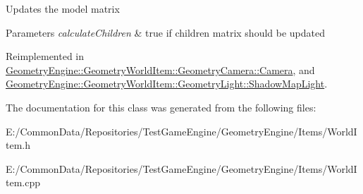 Updates the model matrix 
\begin{DoxyParams}{Parameters}
{\em calculate\+Children} & true if children matrix should be updated \\
\hline
\end{DoxyParams}


Reimplemented in \mbox{\hyperlink{class_geometry_engine_1_1_geometry_world_item_1_1_geometry_camera_1_1_camera_afe7145a1edb13ce3a50c2964f5c865e9}{Geometry\+Engine\+::\+Geometry\+World\+Item\+::\+Geometry\+Camera\+::\+Camera}}, and \mbox{\hyperlink{class_geometry_engine_1_1_geometry_world_item_1_1_geometry_light_1_1_shadow_map_light_a0465932bd0494929e5daa10ce8b77aa6}{Geometry\+Engine\+::\+Geometry\+World\+Item\+::\+Geometry\+Light\+::\+Shadow\+Map\+Light}}.



The documentation for this class was generated from the following files\+:\begin{DoxyCompactItemize}
\item 
E\+:/\+Common\+Data/\+Repositories/\+Test\+Game\+Engine/\+Geometry\+Engine/\+Items/World\+Item.\+h\item 
E\+:/\+Common\+Data/\+Repositories/\+Test\+Game\+Engine/\+Geometry\+Engine/\+Items/World\+Item.\+cpp\end{DoxyCompactItemize}
